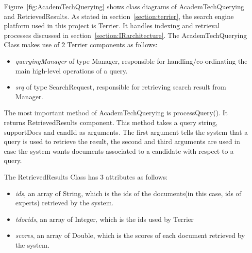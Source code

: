 Figure~\ref{fig:AcademTechQuerying} shows class diagrams of AcademTechQuerying and RetrievedResults. As stated in section~\ref{section:terrier},
the search engine platform used in this project is Terrier. It handles indexing and retrieval processes discussed in section~\ref{section:IRarchitecture}.
The AcademTechQuerying Class makes use of 2 Terrier components as follows:  
\begin{itemize}
 \item \textit{queryingManager} of type Manager, responsible for handling/co-ordinating the main high-level operations of a query.
 \item \textit{srq} of type SearchRequest, responsible for retrieving search result from Manager.
\end{itemize}
The most important method of AcademTechQuerying is processQuery(). It returns RetrievedResults component. This method takes a query string, supportDocs and candId as arguments. The first argument tells
the system that a query is used to retrieve the result, the second and third arguments are used in case the system wants documents associated to a candidate 
with respect to a query.

The RetrievedResults Class has 3 attributes as follows:
\begin{itemize}
 \item \textit{ids}, an array of String, which is the ids of the documents(in this case, ids of experts) retrieved by the system.
 \item \textit{tdocids}, an array of Integer, which is the ids used by Terrier
 \item \textit{scores}, an array of Double, which is the scores of each document retrieved by the system.
\end{itemize}

